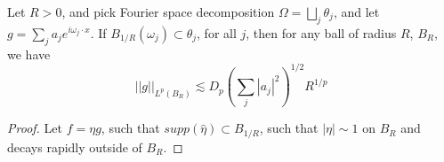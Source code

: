 \begin{proposition}
    Let $R>0$, and pick Fourier space decomposition $\Omega=\bigsqcup_j\theta_j$, and let $g=\sum_ja_je^{i\omega_j\cdot x}$. If $B_{1/R}(\omega_j)\subset\theta_j$, for all $j$, then for any ball of radius $R$, $B_R$, we have
    \begin{equation*}
        ||g||_{L^p(B_R)}\lesssim D_p\left(\sum_j|a_j|^2 \right)^{1/2}R^{1/p}
    \end{equation*}
\end{proposition}
\begin{proof}
    Let $f=\eta g$, such that $supp(\widehat{\eta})\subset B_{1/R}$, such that $|\eta|\sim 1$ on $B_R$ and decays rapidly outside of $B_R$.
\end{proof}

